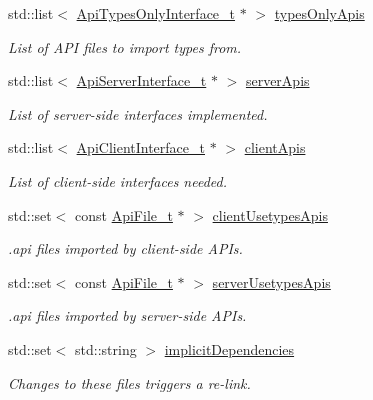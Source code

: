 \begin{DoxyCompactItemize}
std\+::list$<$ \hyperlink{struct_api_types_only_interface__t}{Api\+Types\+Only\+Interface\+\_\+t} $\ast$ $>$ \hyperlink{struct_component__t_a355066d33c088408bd720bf404609798}{types\+Only\+Apis}
\begin{DoxyCompactList}\small\item\em List of A\+PI files to import types from. \end{DoxyCompactList}\item 
std\+::list$<$ \hyperlink{struct_api_server_interface__t}{Api\+Server\+Interface\+\_\+t} $\ast$ $>$ \hyperlink{struct_component__t_ae0b0c4e6dd0ba06030ddf020806facdb}{server\+Apis}
\begin{DoxyCompactList}\small\item\em List of server-\/side interfaces implemented. \end{DoxyCompactList}\item 
std\+::list$<$ \hyperlink{struct_api_client_interface__t}{Api\+Client\+Interface\+\_\+t} $\ast$ $>$ \hyperlink{struct_component__t_a2d294d8fd320f9a9931cbbebbaafcd99}{client\+Apis}
\begin{DoxyCompactList}\small\item\em List of client-\/side interfaces needed. \end{DoxyCompactList}\item 
std\+::set$<$ const \hyperlink{struct_api_file__t}{Api\+File\+\_\+t} $\ast$ $>$ \hyperlink{struct_component__t_aa2c706846b2e8e2ede22fa5431d48191}{client\+Usetypes\+Apis}
\begin{DoxyCompactList}\small\item\em .api files imported by client-\/side A\+P\+Is. \end{DoxyCompactList}\item 
std\+::set$<$ const \hyperlink{struct_api_file__t}{Api\+File\+\_\+t} $\ast$ $>$ \hyperlink{struct_component__t_ac619f06cbbc043ba217d2270a6a04a1e}{server\+Usetypes\+Apis}
\begin{DoxyCompactList}\small\item\em .api files imported by server-\/side A\+P\+Is. \end{DoxyCompactList}\item 
std\+::set$<$ std\+::string $>$ \hyperlink{struct_component__t_a9607f8052fd14e39bd41c9e84ca9358c}{implicit\+Dependencies}
\begin{DoxyCompactList}\small\item\em Changes to these files triggers a re-\/link. \end{DoxyCompactList}\end{DoxyCompactItemize}
